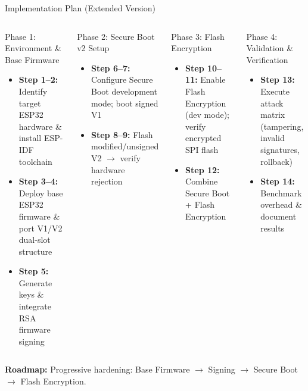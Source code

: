 \documentclass[aspectratio=169]{beamer}
\begin{document}
\begin{frame}{Implementation Plan (Extended Version)}

\begin{columns}[T]
\begin{block}{Phase 1: Environment \& Base Firmware}
\begin{itemize}\small
  \item \textbf{Step 1--2:} Identify target ESP32 hardware \& install ESP-IDF toolchain
  \item \textbf{Step 3--4:} Deploy base ESP32 firmware \& port V1/V2 dual-slot structure
  \item \textbf{Step 5:} Generate keys \& integrate RSA firmware signing
\end{itemize}
\end{block}

\begin{block}{Phase 2: Secure Boot v2 Setup}
\begin{itemize}\small
  \item \textbf{Step 6--7:} Configure Secure Boot development mode; boot signed V1
  \item \textbf{Step 8--9:} Flash modified/unsigned V2 $\rightarrow$ verify hardware rejection
\end{itemize}
\end{block}

\begin{block}{Phase 3: Flash Encryption}
\begin{itemize}\small
  \item \textbf{Step 10--11:} Enable Flash Encryption (dev mode); verify encrypted SPI flash
  \item \textbf{Step 12:} Combine Secure Boot + Flash Encryption
\end{itemize}
\end{block}

\begin{block}{Phase 4: Validation \& Verification}
\begin{itemize}\small
  \item \textbf{Step 13:} Execute attack matrix (tampering, invalid signatures, rollback)
  \item \textbf{Step 14:} Benchmark overhead \& document results
\end{itemize}
\end{block}
\end{columns}

\vspace{4pt}
\centering
{\scriptsize\textbf{Roadmap:} Progressive hardening: Base Firmware $\rightarrow$ Signing $\rightarrow$ Secure Boot $\rightarrow$ Flash Encryption.}

\end{frame}
\end{document}
